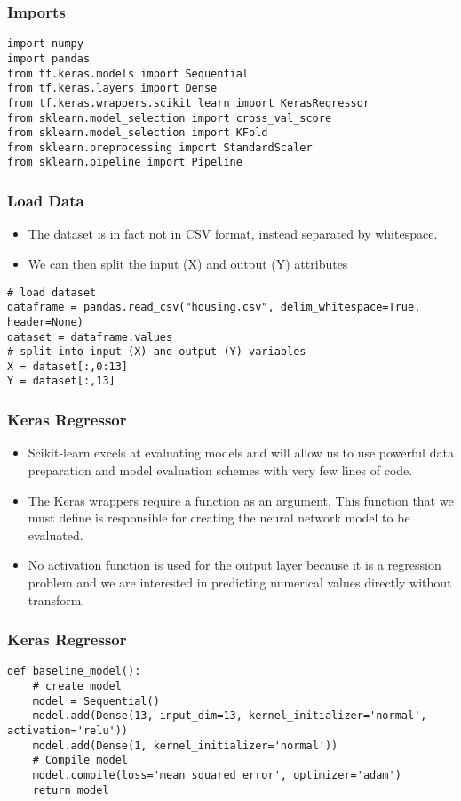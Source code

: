 \begin{frame}[fragile] \frametitle{Imports}
\begin{lstlisting}
import numpy
import pandas
from tf.keras.models import Sequential
from tf.keras.layers import Dense
from tf.keras.wrappers.scikit_learn import KerasRegressor
from sklearn.model_selection import cross_val_score
from sklearn.model_selection import KFold
from sklearn.preprocessing import StandardScaler
from sklearn.pipeline import Pipeline
\end{lstlisting}
\end{frame}

\begin{frame}[fragile] \frametitle{Load Data}
 \begin{itemize}
 \item The dataset is in fact not in CSV format, instead separated by whitespace. 
 \item We can then split the input (X) and output (Y) attributes
 \end{itemize}
\begin{lstlisting}
# load dataset
dataframe = pandas.read_csv("housing.csv", delim_whitespace=True, header=None)
dataset = dataframe.values
# split into input (X) and output (Y) variables
X = dataset[:,0:13]
Y = dataset[:,13]
\end{lstlisting}
\end{frame}


\begin{frame}[fragile] \frametitle{Keras Regressor}
 \begin{itemize}
 \item Scikit-learn excels at evaluating models and will allow us to use powerful data preparation and model evaluation schemes with very few lines of code.
 \item The Keras wrappers require a function as an argument. This function that we must define is responsible for creating the neural network model to be evaluated.
 \item No activation function is used for the output layer because it is a regression problem and we are interested in predicting numerical values directly without transform.
 \end{itemize}
\end{frame}


\begin{frame}[fragile] \frametitle{Keras Regressor}
 \begin{lstlisting}
def baseline_model():
	# create model
	model = Sequential()
	model.add(Dense(13, input_dim=13, kernel_initializer='normal', activation='relu'))
	model.add(Dense(1, kernel_initializer='normal'))
	# Compile model
	model.compile(loss='mean_squared_error', optimizer='adam')
	return model
\end{lstlisting}
\end{frame}


